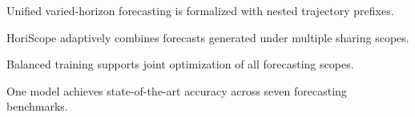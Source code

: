 \begin{highlights}
\item Unified varied-horizon forecasting is formalized with nested trajectory prefixes.
\item HoriScope adaptively combines forecasts generated under multiple sharing scopes.
\item Balanced training supports joint optimization of all forecasting scopes.
\item One model achieves state-of-the-art accuracy across seven forecasting benchmarks.
\end{highlights}

